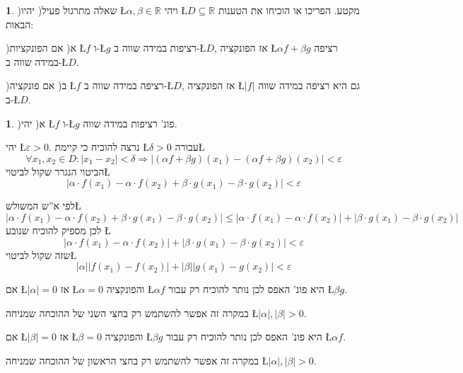 \documentclass[english,hebrew]{article}
\theoremstyle{plain}
\theoremstyle{definition}
\newtheorem{xca}[thm]{\protect\exercisename}
\theoremstyle{definition}
\newtheorem*{sol*}{\protect\solutionname}
\providecommand{\exercisename}{תרגיל}
\providecommand{\solutionname}{פתרון}
\begin{document}
\begin{xca}
)שאלה מתרגול פעיל( יהיו \L{$\alpha,\beta\in\mathbb{R}$} ויהי \L{$D\subseteq\mathbb{R}$}
מקטע. הפריכו או הוכיחו את הטענות הבאות:

)א( אם הפונקציות \L{$f$} ו-\L{$g$} רציפות במידה שווה ב-\L{$D$},
אז הפונקציה \L{$\alpha f+\beta g$} רציפה במידה שווה ב-\L{$D$}.

)ב( אם פונקציה \L{$f$} רציפה במידה שווה ב-\L{$D$}, אז הפונקציה \L{$|f|$}
גם היא רציפה במידה שווה ב-\L{$D$}. 
\end{xca}

\begin{sol*}
)א( יהי \L{$f$} ו-\L{$g$} פונ' רציפות במידה שווה. 

יהי \L{$\varepsilon>0$}. נרצה להוכיח כי קיימת \L{$\delta>0$} עבורה\L{%
\[
\forall x_{1},x_{2}\in D:\left|x_{1}-x_{2}\right|<\delta\Rightarrow\left|\left(\alpha f+\beta g\right)\left(x_{1}\right)-\left(\alpha f+\beta g\right)\left(x_{2}\right)\right|<\varepsilon
\]
}%
הביטוי הנגרר שקול לביטוי\L{%
\[
\left|\alpha\cdot f\left(x_{1}\right)-\alpha\cdot f\left(x_{2}\right)+\beta\cdot g\left(x_{1}\right)-\beta\cdot g\left(x_{2}\right)\right|<\varepsilon
\]
}%

לפי א\textquotedblright ש המשולש\L{%
\[
\left|\alpha\cdot f\left(x_{1}\right)-\alpha\cdot f\left(x_{2}\right)+\beta\cdot g\left(x_{1}\right)-\beta\cdot g\left(x_{2}\right)\right|\le\left|\alpha\cdot f\left(x_{1}\right)-\alpha\cdot f\left(x_{2}\right)\right|+\left|\beta\cdot g\left(x_{1}\right)-\beta\cdot g\left(x_{2}\right)\right|
\]
}%
לכן מספיק להוכיח שנובע \L{%
\[
\left|\alpha\cdot f\left(x_{1}\right)-\alpha\cdot f\left(x_{2}\right)\right|+\left|\beta\cdot g\left(x_{1}\right)-\beta\cdot g\left(x_{2}\right)\right|<\varepsilon
\]
}%
שזה שקול לביטוי\L{%
\[
\left|\alpha\right|\left|f\left(x_{1}\right)-f\left(x_{2}\right)\right|+\left|\beta\right|\left|g\left(x_{1}\right)-g\left(x_{2}\right)\right|<\varepsilon
\]
}%

אם \L{$\left|\alpha\right|=0$} אז \L{$\alpha=0$} והפונקציה \L{$\alpha f$}
היא פונ' האפס לכן נותר להוכיח רק עבור \L{$\beta g$}.

במקרה זה אפשר להשתמש רק בחצי השני של ההוכחה שמניחה \L{$\left|\alpha\right|,\left|\beta\right|>0$}.

אם \L{$\left|\beta\right|=0$} אז \L{$\beta=0$} והפונקציה \L{$\beta g$}
היא פונ' האפס לכן נותר להוכיח רק עבור \L{$\alpha f$}.

במקרה זה אפשר להשתמש רק בחצי הראשון של ההוכחה שמניחה \L{$\left|\alpha\right|,\left|\beta\right|>0$}.


\end{sol*}
\end{document}
